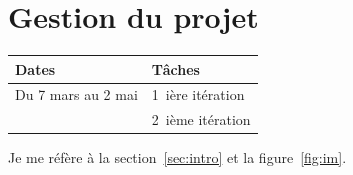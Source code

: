 \documentclass{article}
\begin{document}
\section{Gestion du projet}

\begin{tabular}[h]{|l|l|}
\hline
Dates & Tâches \\
\hline
\hline
Du 7 mars au 2 mai & 1~ière itération \\
                   & 2~ième itération \\
\hline
\end{tabular}

Je me réfère à la section~\ref{sec:intro} et la figure~\ref{fig:im}.



\end{document}
